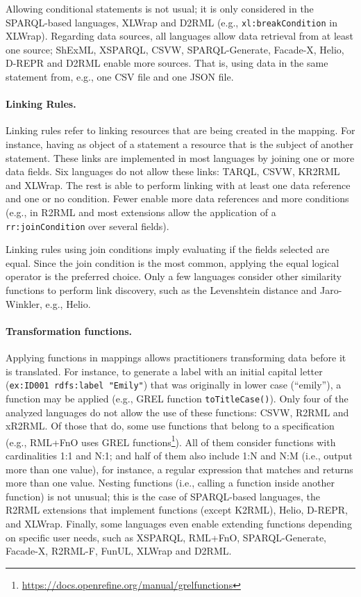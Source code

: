 Allowing conditional statements is not usual; it is only considered in the SPARQL-based languages, XLWrap and D2RML (e.g., \texttt{xl:breakCo\-ndition} in XLWrap). Regarding data sources, all languages allow data retrieval from at least one source; ShExML, XSPARQL, CSVW, SPARQL-Generate, Facade-X, Helio, D-REPR and D2RML enable more sources. That is, using data in the same statement from, e.g., one CSV file and one JSON file.


\noindent\paragraph{\textbf{Linking Rules.}} Linking rules refer to linking resources that are being created in the mapping. For instance, having as object of a statement a resource that is the subject of another statement. These links are implemented in most languages by joining one or more data fields. Six languages do not allow these links: TARQL, CSVW, KR2RML and XLWrap. The rest is able to perform linking with at least one data reference and one or no condition. Fewer enable more data references and more conditions (e.g., in R2RML and most extensions allow the application of a \texttt{rr:joinCondition} over several fields). 

Linking rules using join conditions imply evaluating if the fields selected are equal. Since the join condition is the most common, applying the equal logical operator is the preferred choice. Only a few languages consider other similarity functions to perform link discovery, such as the Levenshtein distance and Jaro-Winkler, e.g., Helio. %




\noindent\paragraph{\textbf{Transformation functions.}} Applying functions in mappings allows practitioners transforming data before it is translated. For instance, to generate a label with an initial capital letter (\texttt{ex:ID001 rdfs:label "Emily"}) that was originally in lower case (``emily''), a function may be applied (e.g., GREL function \texttt{toTi\-tleCase()}). Only four of the analyzed languages do not allow the use of these functions: CSVW, R2RML and xR2RML. Of those that do, some use functions that belong to a specification (e.g., RML+FnO uses GREL functions\footnote{\url{https://docs.openrefine.org/manual/grelfunctions}}). All of them consider functions with cardinalities 1:1 and N:1; and half of them also include 1:N and N:M (i.e., output more than one value), for instance, a regular expression that matches and returns more than one value.  Nesting functions (i.e., calling a function inside another function) is not unusual; this is the case of SPARQL-based languages, the R2RML extensions that implement functions (except K2RML), Helio, D-REPR, and XLWrap. Finally, some languages even enable extending functions depending on specific user needs, such as XSPARQL, RML+FnO, SPARQL-Generate, Facade-X, R2RML-F, FunUL, XLWrap and D2RML.

